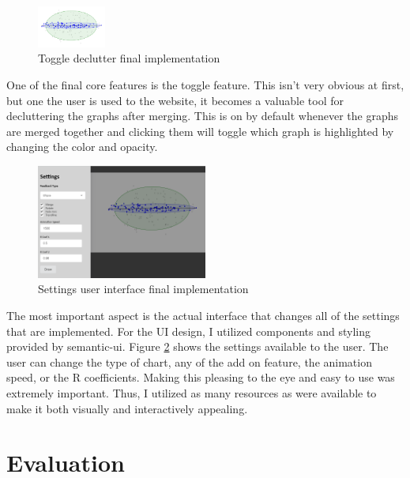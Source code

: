\documentclass{proc}
\begin{document}
		\begin{figure}[t]
			\centering
			\includegraphics[width=0.2\textwidth]{toggle}
			\caption{Toggle declutter final implementation}
			\label{fig:toggle}
		\end{figure}
		
		One of the final core features is the toggle feature. This isn't very obvious at first, but one the user is used to the website, it becomes a valuable tool for decluttering the graphs after merging. This is on by default whenever the graphs are merged together and clicking them will toggle which graph is highlighted by changing the color and opacity. 
		
		\begin{figure}[t]
			\centering
			\includegraphics[width=0.5\textwidth]{ui}
			\caption{Settings user interface final implementation}
			\label{fig:ui}
		\end{figure}
		
		The most important aspect is the actual interface that changes all of the settings that are implemented. For the UI design, I utilized components and styling provided by semantic-ui. Figure \ref{fig:ui} shows the settings available to the user. The user can change the type of chart, any of the add on feature, the animation speed, or the R coefficients. Making this pleasing to the eye and easy to use was extremely important. Thus, I utilized as many resources as were available to make it both visually and interactively appealing. 
		
	\section{Evaluation}
		
\end{document}
